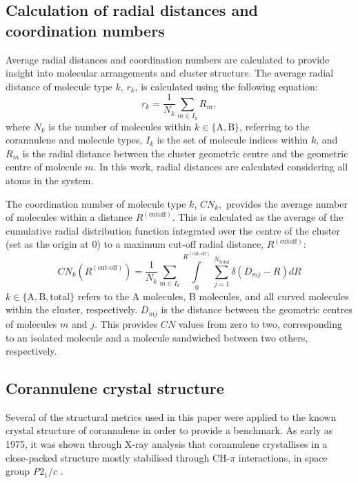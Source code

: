 \subsection{Calculation of radial distances and coordination numbers}
\label{secSI:raddist_CN_eqns}
%
Average radial distances and coordination numbers are calculated to provide insight into molecular arrangements and cluster structure. The average radial distance of molecule type $k$, $r_{k}$, is calculated using the following equation:
\begin{equation}
    r_{k} = \frac{1}{N_{k}}\sum_{m \in I_{k}}R_{m},
\end{equation}
where $N_{k}$ is the number of molecules within $k \in \{\text{A},\text{B}\}$, referring to the corannulene and  molecule types, $I_{k}$ is the set of molecule indices within $k$, and $R_{m}$ is the radial distance between the cluster geometric centre and the geometric centre of molecule $m$. In this work, radial distances are calculated considering all atoms in the system.

The coordination number of molecule type $k$, $CN_{k},$ provides the average number of molecules within a distance $R^{(\text{cutoff})}$. This is calculated as the average of the cumulative radial distribution function integrated over the centre of the cluster (set as the origin at 0) to a maximum cut-off radial distance, $R^{(\text{cutoff})}$:
\begin{equation}
    CN_{k}(R^{(\text{cut-off})}) = \frac{1}{N_{k}} \sum_{m \in I_{k}} \int\limits_{0}^{R^{(\text{cut-off})}}  \sum_{j=1}^{N_{\text{total}}} \delta(D_{mj} - R) dR
\end{equation}
$k \in \{\text{A}, \text{B}, \text{total}\}$ refers to the A molecules, B molecules, and all curved molecules within the cluster, respectively. $D_{mj}$ is the distance between the geometric centres of molecules $m$ and $j$. 
This provides $CN$ values from zero to two, corresponding to an isolated molecule and a molecule sandwiched between two others, respectively.

\subsection{Corannulene crystal structure}
\label{secSI:corannulenecrystal}
Several of the structural metrics used in this paper were applied to the known crystal structure of corannulene in order to provide a benchmark. As early as 1975, it was shown through X-ray analysis that corannulene crystallises in a close-packed structure mostly stabilised through CH-$\pi$ interactions, in space group \textit{P}$2_{1}/c$ \cite{hanson1976crystal}.


